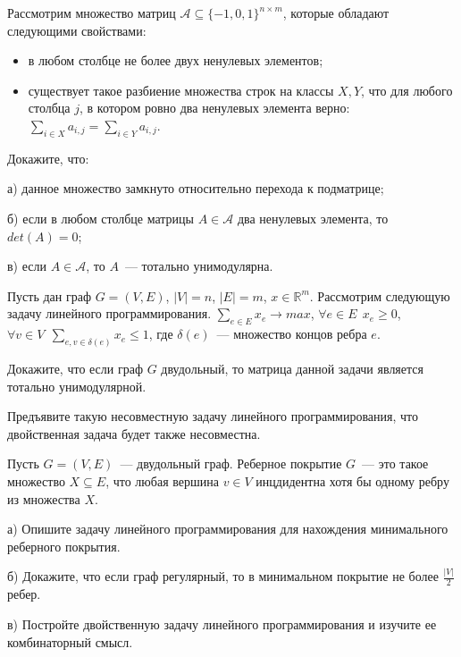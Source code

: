 \setcounter{curtask}{31}


\begin{task}
	Рассмотрим множество матриц $\mathcal{A} \subseteq \{-1, 0, 1\}^{n \times m}$,
	которые обладают следующими свойствами:
    \begin{itemize}
		\item в любом столбце не более двух ненулевых элементов;
    	\item существует такое разбиение множества строк на классы $X, Y$, что
		    для любого столбца $j$, в котором ровно два ненулевых элемента верно:
            $\sum\limits_{i \in X}{a_{i,j}} = \sum\limits_{i \in Y}{a_{i,j}}$.
    \end{itemize}

    Докажите, что:
    
    а) данное множество замкнуто относительно перехода к подматрице;
    
    б) если в любом столбце матрицы $A \in \mathcal{A}$ два ненулевых элемента, то
	$det(A) = 0$;
    
    в) если $A \in \mathcal{A}$, то $A$~--- тотально унимодулярна.
\end{task}


\begin{task}
    Пусть дан граф $G = (V, E)$, $|V| = n$, $|E| = m$, $x \in
    \mathbb{R}^m$. Рассмотрим следующую задачу линейного программирования.
    $\sum_{e \in E} x_e \rightarrow max$, $\forall e \in E ~~ x_e \ge 0$,
    $\forall v \in V ~~ \sum_{e, v \in \delta(e)} x_e \le 1$, где $\delta(e)$~---
    множество концов ребра $e$.

    Докажите, что если граф $G$ двудольный, то матрица данной задачи является
    тотально унимодулярной.
\end{task}

\begin{task}
    Предъявите такую несовместную задачу линейного программирования, что двойственная
    задача будет также несовместна.
\end{task}

\begin{task}
    Пусть $G = (V, E)$~--- двудольный граф. Реберное покрытие $G$~--- это такое
    множество $X \subseteq E$, что любая вершина $v \in V$ инцдидентна хотя бы одному
    ребру из множества $X$.

  	а) Опишите задачу линейного программирования для нахождения минимального
    реберного покрытия.

    б) Докажите, что если граф регулярный, то в минимальном покрытие не более
    $\frac{|V|}{2}$ ребер.

    в) Постройте двойственную задачу линейного программирования и изучите ее
    комбинаторный смысл.
\end{task}



\breakline
